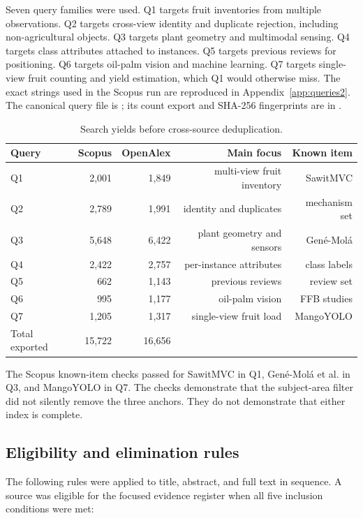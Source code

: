 Seven query families were used. Q1 targets fruit inventories from multiple observations. Q2 targets cross-view identity and duplicate rejection, including non-agricultural objects. Q3 targets plant geometry and multimodal sensing. Q4 targets class attributes attached to instances. Q5 targets previous reviews for positioning. Q6 targets oil-palm vision and machine learning. Q7 targets single-view fruit counting and yield estimation, which Q1 would otherwise miss. The exact strings used in the Scopus run are reproduced in Appendix~\ref{app:queries2}. The canonical query file is ; its count export and SHA-256 fingerprints are in .

\begin{table}[t]
\centering
\caption{Search yields before cross-source deduplication.}
\label{tab:searchcounts2}
\small
\begin{tabular}{lrrrr}
\toprule
Query & Scopus & OpenAlex & Main focus & Known item\\
\midrule
Q1 & 2,001 & 1,849 & multi-view fruit inventory & SawitMVC\\
Q2 & 2,789 & 1,991 & identity and duplicates & mechanism set\\
Q3 & 5,648 & 6,422 & plant geometry and sensors & Gené-Molá\\
Q4 & 2,422 & 2,757 & per-instance attributes & class labels\\
Q5 & 662 & 1,143 & previous reviews & review set\\
Q6 & 995 & 1,177 & oil-palm vision & FFB studies\\
Q7 & 1,205 & 1,317 & single-view fruit load & MangoYOLO\\
\midrule
Total exported & 15,722 & 16,656 & & \\
\bottomrule
\end{tabular}
\end{table}

The Scopus known-item checks passed for SawitMVC in Q1, Gené-Molá et al. in Q3, and MangoYOLO in Q7. The checks demonstrate that the subject-area filter did not silently remove the three anchors. They do not demonstrate that either index is complete.

\subsection{Eligibility and elimination rules}

The following rules were applied to title, abstract, and full text in sequence. A source was eligible for the focused evidence register when all five inclusion conditions were met:

